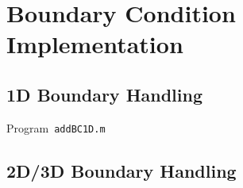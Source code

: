 
\section{Boundary Condition Implementation}

\subsection{1D Boundary Handling}

\begin{listing}[ht!]
	\tiny
	\centering
	\caption{Program~\texttt{addBC1D.m}}
	\label{code:addBC1D.m}
\end{listing}

\subsection{2D/3D Boundary Handling}
